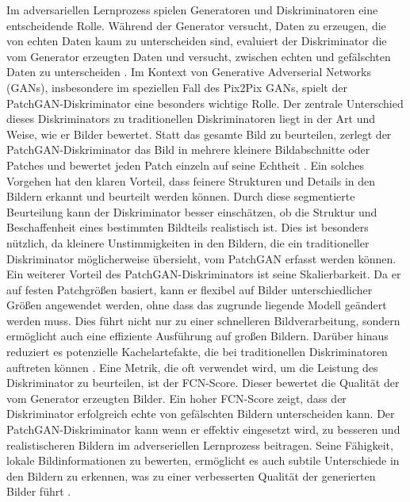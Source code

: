 Im adversariellen Lernprozess spielen Generatoren und Diskriminatoren eine entscheidende Rolle. Während der Generator versucht, Daten zu erzeugen, die von echten Daten kaum zu unterscheiden sind, evaluiert der Diskriminator die vom Generator erzeugten Daten und versucht, zwischen echten und gefälschten Daten zu unterscheiden \cite{PhillipIsola.}.\newline
Im Kontext von Generative Adverserial Networks (GANs), insbesondere im speziellen Fall des Pix2Pix GANs, spielt der PatchGAN-Diskriminator eine besonders wichtige Rolle. Der zentrale Unterschied dieses Diskriminators zu traditionellen Diskriminatoren liegt in der Art und Weise, wie er Bilder bewertet. Statt das gesamte Bild zu beurteilen, zerlegt der PatchGAN-Diskriminator das Bild in mehrere kleinere Bildabschnitte oder Patches und bewertet jeden Patch einzeln auf seine Echtheit \cite{PhillipIsola.}. \newline
Ein solches Vorgehen hat den klaren Vorteil, dass feinere Strukturen und Details in den Bildern erkannt und beurteilt werden können. Durch diese segmentierte Beurteilung kann der Diskriminator besser einschätzen, ob die Struktur und Beschaffenheit eines bestimmten Bildteils realistisch ist. Dies ist besonders nützlich, da kleinere Unstimmigkeiten in den Bildern, die ein traditioneller Diskriminator möglicherweise übersieht, vom PatchGAN erfasst werden können. \newline
Ein weiterer Vorteil des PatchGAN-Diskriminators ist seine Skalierbarkeit. Da er auf festen Patchgrößen basiert, kann er flexibel auf Bilder unterschiedlicher Größen angewendet werden, ohne dass das zugrunde liegende Modell geändert werden muss. Dies führt nicht nur zu einer schnelleren Bildverarbeitung, sondern ermöglicht auch eine effiziente Ausführung auf großen Bildern. Darüber hinaus reduziert es potenzielle Kachelartefakte, die bei traditionellen Diskriminatoren auftreten können \cite{PhillipIsola.}.\newline
Eine Metrik, die oft verwendet wird, um die Leistung des Diskriminator zu beurteilen, ist der FCN-Score. Dieser bewertet die Qualität der vom Generator erzeugten Bilder. Ein hoher FCN-Score zeigt, dass der Diskriminator erfolgreich echte von gefälschten Bildern unterscheiden kann. \newline
Der PatchGAN-Diskriminator kann wenn er effektiv eingesetzt wird, zu besseren und realistischeren Bildern im adverseriellen Lernprozess beitragen. Seine Fähigkeit, lokale Bildinformationen zu bewerten, ermöglicht es auch subtile Unterschiede in den Bildern zu erkennen, was zu einer verbesserten Qualität der generierten Bilder führt \cite{PhillipIsola.}.

